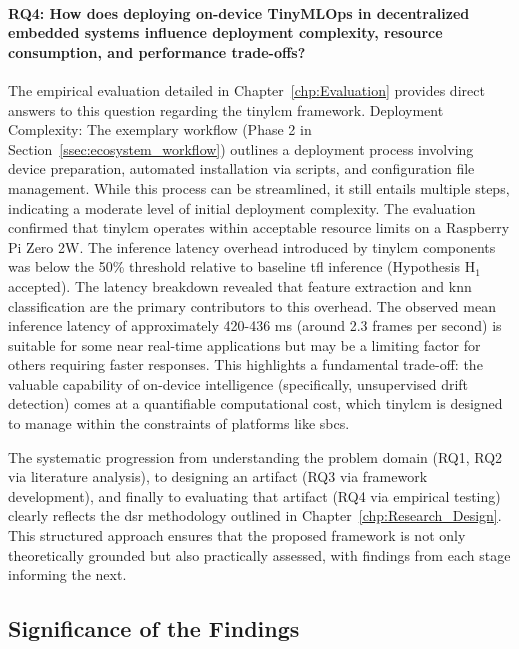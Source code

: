 \paragraph{RQ4: How does deploying on-device TinyMLOps in decentralized embedded systems influence deployment complexity, resource consumption, and performance trade-offs?}
The empirical evaluation detailed in Chapter~\ref{chp:Evaluation} provides direct answers to this question regarding the \gls{tinylcm} framework.
Deployment Complexity: The exemplary workflow (Phase 2 in Section~\ref{ssec:ecosystem_workflow}) outlines a deployment process involving device preparation, automated installation via scripts, and configuration file management. While this process can be streamlined, it still entails multiple steps, indicating a moderate level of initial deployment complexity.
The evaluation confirmed that \gls{tinylcm} operates within acceptable resource limits on a Raspberry Pi Zero 2W. The inference latency overhead introduced by \gls{tinylcm} components was below the 50\% threshold relative to baseline \gls{tfl} inference (Hypothesis H$_1$ accepted). The latency breakdown revealed that feature extraction and \gls{knn} classification are the primary contributors to this overhead. The observed mean inference latency of approximately 420-436 ms (around 2.3 frames per second) is suitable for some near real-time applications but may be a limiting factor for others requiring faster responses. This highlights a fundamental trade-off: the valuable capability of on-device intelligence (specifically, unsupervised drift detection) comes at a quantifiable computational cost, which \gls{tinylcm} is designed to manage within the constraints of platforms like \glspl{sbc}.

The systematic progression from understanding the problem domain (RQ1, RQ2 via literature analysis), to designing an artifact (RQ3 via framework development), and finally to evaluating that artifact (RQ4 via empirical testing) clearly reflects the \gls{dsr} methodology outlined in Chapter~\ref{chp:Research_Design}. This structured approach ensures that the proposed framework is not only theoretically grounded but also practically assessed, with findings from each stage informing the next.

\subsection{Significance of the Findings}
\label{ssec:significance_findings}

